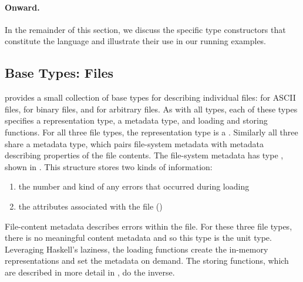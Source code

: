 
\paragraph{Onward.}
In the remainder of this section, we discuss the specific type
constructors that constitute the \forest{} language and illustrate
their use in our running examples.  


\subsection{Base Types: Files}
\label{sec:basics}
\forest{} provides a small collection of base types for describing
individual files:  for ASCII files,  for binary files, and
 for arbitrary files.  As with all \forest{} types, each of
these types specifies a representation type, a metadata type, and 
loading and storing functions. 
For all three file types, the representation type is a
.
Similarly all three share a metadata type, which
pairs file-system metadata
with metadata describing properties of the file contents.  The
file-system metadata has type , shown in
.  
%
%
This structure stores two kinds of
information: 
\begin{enumerate} 
\item the number and kind of any errors that occurred during loading 
\item the attributes associated with the file ()
\end{enumerate} %
File-content metadata describes errors within the file.
For these three file types, there is
no meaningful content metadata and so this type is the unit type.
Leveraging Haskell's laziness, the loading functions create the
in-memory representations and set the metadata on demand.  The storing
functions, which are described in more detail in ,
do the inverse.

